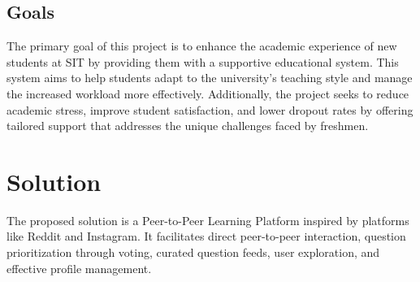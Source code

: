 \subsection{Goals}
The primary goal of this project is to enhance the academic experience of new students at SIT by providing them with a supportive educational system. This system aims to help students adapt to the university's teaching style and manage the increased workload more effectively. Additionally, the project seeks to reduce academic stress, improve student satisfaction, and lower dropout rates by offering tailored support that addresses the unique challenges faced by freshmen.

\section{Solution}\label{solution}
The proposed solution is a Peer-to-Peer Learning Platform inspired by platforms like Reddit and Instagram. It facilitates direct peer-to-peer interaction, question prioritization through voting, curated question feeds, user exploration, and effective profile management.





 
